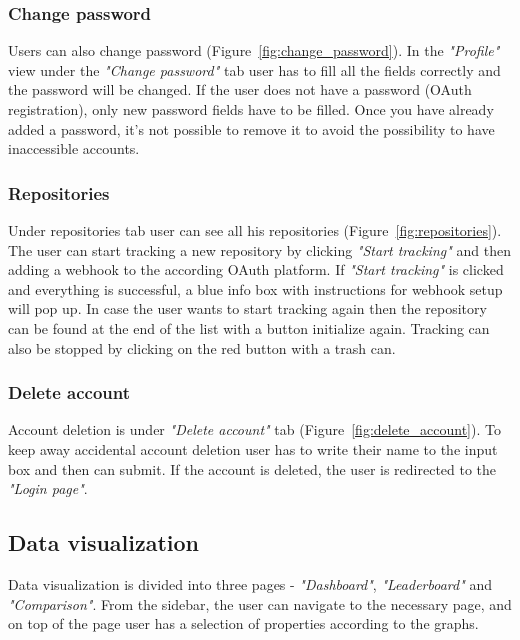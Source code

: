 \subsubsection{Change password}\label{subsubsec:change-password}
Users can also change password (Figure~\ref{fig:change_password}).
In the \textit{"Profile"} view under the \textit{"Change password"} tab user has to fill all the fields correctly and the password will be changed.
If the user does not have a password (OAuth registration), only new password fields have to be filled.
Once you have already added a password, it's not possible to remove it to avoid the possibility to have inaccessible accounts.

\subsubsection{Repositories}\label{subsubsec:repositories}
Under repositories tab user can see all his repositories (Figure~\ref{fig:repositories}).
The user can start tracking a new repository by clicking \textit{"Start tracking"} and then adding a webhook to the according OAuth platform.
If \textit{"Start tracking"} is clicked and everything is successful, a blue info box with instructions for webhook setup will pop up.
In case the user wants to start tracking again then the repository can be found at the end of the list with a button initialize again.
Tracking can also be stopped by clicking on the red button with a trash can.

\subsubsection{Delete account}\label{subsubsec:delete-account}
Account deletion is under \textit{"Delete account"} tab (Figure~\ref{fig:delete_account}).
To keep away accidental account deletion user has to write their name to the input box and then can submit.
If the account is deleted, the user is redirected to the \textit{"Login page"}.

\subsection{Data visualization}\label{subsec:data-visualization}
Data visualization is divided into three pages - \textit{"Dashboard"}, \textit{"Leaderboard"} and \textit{"Comparison"}.
From the sidebar, the user can navigate to the necessary page, and on top of the page user has a selection of properties according to the graphs.


